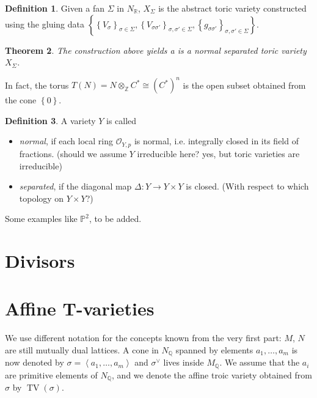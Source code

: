 \documentclass[a4paper]{article}
\DeclareMathOperator{\TV}{TV}
\newtheorem{theorem}{Theorem}[section]
\theoremstyle{definition}
\newtheorem{definition}[theorem]{Definition}
\begin{document}
  \begin{definition}
    Given  a fan $\Sigma$ in $N_{\mathbb{R}}$, $X_{\Sigma}$ is the abstract toric variety constructed using the gluing data $\left\{ \left\{V_{\sigma}\right\}_{\sigma \in \Sigma}, \left\{V_{\sigma \sigma'}\right\}_{\sigma, \sigma' \in \Sigma}, \left\{g_{\sigma \sigma'}\right\}_{\sigma, \sigma' \in \Sigma}\right\}$.
  \end{definition}
  \begin{theorem}
    The construction above yields a is a normal separated toric variety $X_{\Sigma}$.
  \end{theorem}
  In fact, the torus $T \left( N \right) = N \otimes_{\mathbb{Z}} C^{*} \cong \left( C^{*} \right)^{n}$ is the open subset obtained from the cone $\left\{ 0\right\}$.
  \begin{definition}
    A variety $Y$ is called
    \begin{itemize}
      \item \emph{normal}, if each local ring $\mathcal{O} _{Y,p}$ is normal, i.e. integrally closed in its field of fractions. (should we assume $Y$ irreducible here? yes, but toric varieties are irreducible)
      \item \emph{separated}, if the diagonal map $\Delta \colon Y \rightarrow  Y \times Y$ is closed. (With respect to which topology on $Y \times Y$?)
    \end{itemize}
  \end{definition}

  Some examples like $\mathbb{P}^{2}$, to be added.\\

  
  
  \pagebreak
  \section{Divisors}

  \section{Affine T-varieties}
  We use different notation for the concepts known from the very first part: $M$, $ N$ are still mutually dual lattices. A cone in $N_{\mathbb{Q}}$ spanned by elements $a_{1}, \dots, a_{m}$ is now denoted by $\sigma = \left\langle a_{1}, \dots, a_{m} \right\rangle$ and $\sigma ^{\vee}  $ lives inside $M_{\mathbb{Q}}$. We assume that the $a_{i}$ are primitive elements of $N_{\mathbb{Q}}$, and we denote the affine troic variety obtained from $\sigma$ by $\TV \left( \sigma \right)$.
\end{document}
